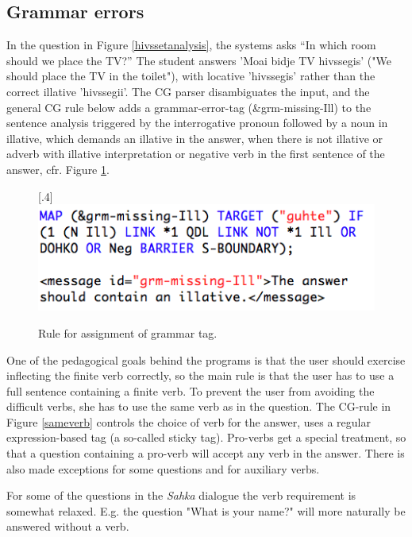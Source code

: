 \documentclass[11pt]{article}
\begin{document}
\subsection{Grammar errors}
In the question in Figure \ref{hivssetanalysis}, the systems asks “In which room should we place the TV?” The student answers 'Moai bidje TV hivssegis' ("We should place the TV in the toilet"), with locative 'hivssegis' rather than the correct illative 'hivssegii'. The CG parser disambiguates the input, and the general CG rule below adds a grammar-error-tag (\&grm-missing-Ill) to the sentence analysis triggered by the interrogative pronoun followed by a noun in illative, which demands an illative in the answer, when there is not illative or adverb with illative interpretation or negative verb in the first sentence of the answer, cfr. Figure \ref{missingill}.  


\begin{figure}[htbp]
\begin{center}
\scalebox{.4}[.4]{\includegraphics{presentation/img/missingIll.png}}\\
\caption{Rule for assignment of grammar tag.}
\label{missingill}
\end{center}
\end{figure}

One of the pedagogical goals behind the programs is that the user should exercise inflecting the finite verb correctly, so the main rule is that the user has to use a full sentence containing a finite verb. To prevent the user from avoiding the difficult verbs, she has to use the same verb as in the question. The CG-rule in Figure \ref{sameverb} controls the choice of verb for the answer, uses a regular expression-based tag (a so-called sticky tag). Pro-verbs get a special treatment, so that a question containing a pro-verb will accept any verb in the answer. There is also made exceptions for some questions and for auxiliary verbs.

For some of the questions in the \textit{Sahka} dialogue the verb requirement is somewhat relaxed. E.g. the question "What is your name?" will more naturally be answered without a verb.  
\end{document}
